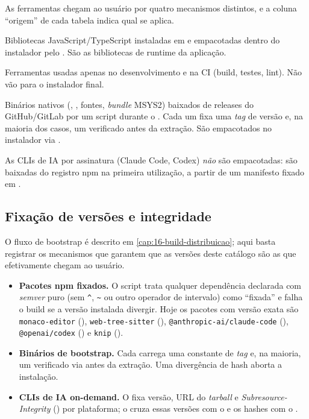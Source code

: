 As ferramentas chegam ao usuário por quatro mecanismos distintos, e a coluna
\enquote{origem} de cada tabela indica qual se aplica.

\begin{description}[leftmargin=2.2em]
  \item[npm (\code{dependencies}).] Bibliotecas JavaScript/TypeScript instaladas
  em  e empacotadas dentro do instalador pelo
  . São as bibliotecas de runtime da aplicação.
  \item[npm (\code{devDependencies}).] Ferramentas usadas apenas no
  desenvolvimento e na CI (build, testes, lint). Não vão para o instalador final.
  \item[Bootstrap (download fixado).] Binários nativos (, ,
  fontes, \emph{bundle} MSYS2) baixados de releases do GitHub/GitLab por um script
   durante o . Cada um fixa uma
  \emph{tag} de versão e, na maioria dos casos, um  verificado antes
  da extração. São empacotados no instalador via .
  \item[On-demand (runtime).] As CLIs de IA por assinatura (Claude Code, Codex)
  \emph{não} são empacotadas: são baixadas do registro npm na primeira utilização,
  a partir de um manifesto fixado em .
\end{description}

\subsection{Fixação de versões e integridade}

O fluxo de bootstrap é descrito em
\autoref{cap:16-build-distribuicao}; aqui basta registrar os mecanismos que
garantem que as versões deste catálogo são as que efetivamente chegam ao usuário.

\begin{itemize}[leftmargin=1.4em]
  \item \textbf{Pacotes npm fixados.} O script 
  trata qualquer dependência declarada com \emph{semver} puro (sem \lstinline|^|,
  \lstinline|~| ou outro operador de intervalo) como \enquote{fixada} e
  falha o build se a versão instalada divergir. Hoje os pacotes com versão exata
  são \lstinline|monaco-editor| (), \lstinline|web-tree-sitter|
  (), \lstinline|@anthropic-ai/claude-code| (),
  \lstinline|@openai/codex| () e \lstinline|knip| ().
  \item \textbf{Binários de bootstrap.} Cada  carrega uma
  constante de \emph{tag} e, na maioria, um  verificado
  via  antes da extração. Uma divergência
  de hash aborta a instalação.
  \item \textbf{CLIs de IA on-demand.} O  fixa versão,
  URL do \emph{tarball} e \emph{Subresource-Integrity} () por
  plataforma; o  cruza essas versões com o
   e os hashes com o .
\end{itemize}

